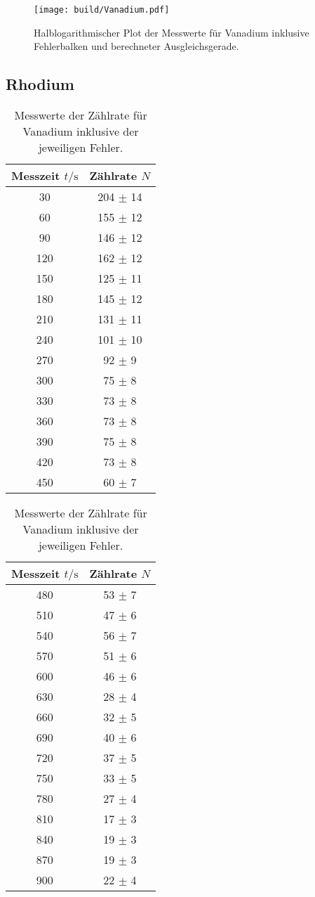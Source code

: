 \begin{figure}[H]
    \centering
    \texttt{[image: build/Vanadium.pdf]}
    \caption{Halblogarithmischer Plot der Messwerte für Vanadium inklusive Fehlerbalken und berechneter Ausgleichsgerade.}
    \label{fig:Vn}
\end{figure}

\subsection{Rhodium}

\begin{table}
    \centering
    \begin{tabular}{c c}
      \toprule
      Messzeit $t/\unit{\second}$ & Zählrate $N$\\
      \midrule
       30 & 204 $\pm$ 14 \\
       60 & 155 $\pm$ 12 \\
       90 & 146 $\pm$ 12 \\
      120 & 162 $\pm$ 12 \\
      150 & 125 $\pm$ 11 \\
      180 & 145 $\pm$ 12 \\
      210 & 131 $\pm$ 11 \\
      240 & 101 $\pm$ 10 \\
      270 &  92 $\pm$  9 \\
      300 &  75 $\pm$  8 \\
      330 &  73 $\pm$  8 \\
      360 &  73 $\pm$  8 \\
      390 &  75 $\pm$  8 \\
      420 &  73 $\pm$  8 \\
      450 &  60 $\pm$  7 \\
      \bottomrule
    \end{tabular}
    \begin{tabular}{c c}
      \toprule
      Messzeit $t/\unit{\second}$ & Zählrate $N$\\
      \midrule
      480 & 53 $\pm$ 7 \\
      510 & 47 $\pm$ 6 \\
      540 & 56 $\pm$ 7 \\
      570 & 51 $\pm$ 6 \\
      600 & 46 $\pm$ 6 \\
      630 & 28 $\pm$ 4 \\
      660 & 32 $\pm$ 5 \\
      690 & 40 $\pm$ 6 \\
      720 & 37 $\pm$ 5 \\
      750 & 33 $\pm$ 5 \\
      780 & 27 $\pm$ 4 \\
      810 & 17 $\pm$ 3 \\
      840 & 19 $\pm$ 3 \\
      870 & 19 $\pm$ 3 \\
      900 & 22 $\pm$ 4 \\
      \bottomrule
    \end{tabular}
    \caption{Messwerte der Zählrate für Vanadium inklusive der jeweiligen Fehler.}
    \label{tab:Rh}
\end{table}

